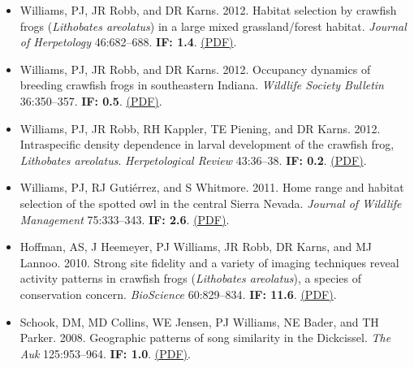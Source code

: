 \begin{itemize}
\item Williams, PJ, JR Robb, and DR Karns. 2012. Habitat selection by crawfish frogs (\emph{Lithobates areolatus}) in a large mixed grassland/forest habitat. \emph{Journal of Herpetology} 46:682--688. \textbf{IF: 1.4}. \href{http://www.perrywilliams.us/wp-content/uploads/2023/05/williams2012habitat.pdf}{(PDF)}.
\item Williams, PJ, JR Robb, and DR Karns. 2012. Occupancy dynamics of breeding crawfish frogs in southeastern Indiana. \emph{Wildlife Society Bulletin} 36:350--357. \textbf{IF: 0.5}. \href{http://www.perrywilliams.us/wp-content/uploads/2023/05/Williams2012occupancy.pdf}{(PDF)}.
\item Williams, PJ, JR Robb, RH Kappler, TE Piening, and DR Karns. 2012. Intraspecific density dependence in larval development of the crawfish frog, \emph{Lithobates areolatus}. \emph{Herpetological Review} 43:36--38. \textbf{IF: 0.2}. \href{https://www.perrywilliams.us/wp-content/uploads/2018/03/williams2012intraspecific.pdf}{(PDF)}.
\item Williams, PJ, RJ Guti\'errez, and S Whitmore. 2011. Home range and habitat selection of the spotted owl in the central Sierra Nevada. \emph{Journal of Wildlife Management} 75:333--343. \textbf{IF: 2.6}. \href{http://www.perrywilliams.us/wp-content/uploads/2023/05/williams2012home.pdf}{(PDF)}.
\item Hoffman, AS, J Heemeyer, PJ Williams, JR Robb, DR Karns, and MJ Lannoo. 2010. Strong site fidelity and a variety of imaging techniques reveal activity patterns in crawfish frogs (\emph{Lithobates areolatus}), a species of conservation concern. \emph{BioScience} 60:829--834. \textbf{IF: 11.6}. \href{http://www.perrywilliams.us/wp-content/uploads/2023/05/hoffman2010strong.pdf}{(PDF)}.
\item Schook, DM, MD Collins, WE Jensen, PJ Williams, NE Bader, and TH Parker. 2008. Geographic patterns of song similarity in the Dickcissel. \emph{The Auk} 125:953--964. \textbf{IF: 1.0}. \href{http://www.perrywilliams.us/wp-content/uploads/2023/05/schook2008geographic.pdf}{(PDF)}.
\end{itemize}
